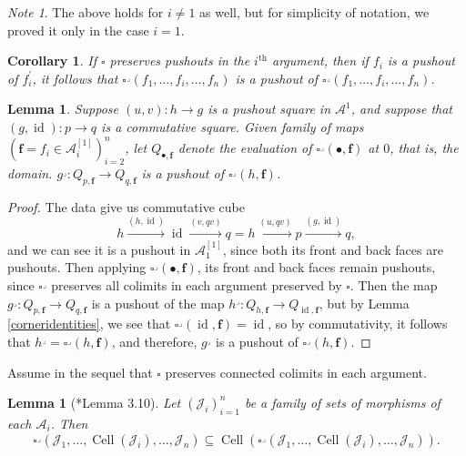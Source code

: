 \documentclass[leqno]{article}
\numberwithin{equation}{subsection}
\theoremstyle{plain}   %
\newtheorem{cor}[equation]{Corollary}
\newtheorem{lemma}[equation]{Lemma}
\theoremstyle{remark}
\newtheorem{note}[equation]{Note}
\theoremstyle{plain}
\DeclareMathOperator{\id}{id}
\begin{document}
\begin{note}
	The above holds for \(i\neq 1\) as well, but for simplicity of notation, we proved it only in the case \(i=1\).  
\end{note}
\begin{cor}\label{cornerpushouts}
	If \(\square\) preserves pushouts in the \(i^{\mathrm{th}}\) argument, then if \(f_i\) is a pushout of \(f_i^\prime\), it follows that \(\square^\lrcorner(f_1,\dots,f_i,\dots,f_n)\) is a pushout of \(\square^\lrcorner(f_1,\dots,f_i,\dots,f_n)\).
\end{cor}
\begin{lemma}
	Suppose \((u,v):h\to g\) is a pushout square in \(\mathcal{A}^1\), and suppose that \((g,\id):p\to q\) is a commutative square.  Given family of maps \((\mathbf{f}=f_i \in \mathcal{A}_i^{[1]})_{i=2}^n\), let \(Q_{\bullet,\mathbf{f}}\) denote the evaluation of \(\square^\lrcorner(\bullet,\mathbf{f})\) at \(0\), that is, the domain.  \(g^\lrcorner: Q_{p,\mathbf{f}} \to Q_{q,\mathbf{f}}\) is a pushout of \(\square^\lrcorner(h,\mathbf{f})\).  
\end{lemma}
\begin{proof} The data give us commutative cube 
	\[h \xrightarrow{(h,\id)} \id \xrightarrow{(v,qv)} q = h \xrightarrow{(u,qv)} p \xrightarrow{(g,\id)} q,\]
	and we can see it is a pushout in \(\mathcal{A}_1^{[1]}\), since both its front and back faces are pushouts.  Then applying \(\square^\lrcorner(\bullet,\mathbf{f})\), its front and back faces remain pushouts, since \(\square^\lrcorner\) preserves all colimits in each argument preserved by \(\square\).  Then the map \(g^\lrcorner: Q_{p,\mathbf{f}} \to Q_{q,\mathbf{f}}\)  is a pushout of the map \(h^\lrcorner:Q_{h,\mathbf{f}} \to Q_{\id,\mathbf{f}}\), but by Lemma \ref{corneridentities}, we see that \(\square^\lrcorner(\id,\mathbf{f})=\id\), so by commutativity, it follows that \(h^\lrcorner = \square^\lrcorner(h,\mathbf{f})\), and therefore, \(g^\lrcorner\) is a pushout of \(\square^\lrcorner(h,\mathbf{f})\).  
\end{proof}
Assume in the sequel that \(\square\) preserves connected colimits in each argument.
\begin{lemma}[\cite{oury}*{Lemma 3.10}]\label{cornertensorcell}
	Let \((\mathscr{J}_i)_{i=1}^n\) be a family of sets of morphisms of each \(\mathcal{A}_i\). Then 
	\[\square^\lrcorner(\mathscr{J}_1,\dots,\operatorname{Cell}(\mathscr{J}_i),\dots,\mathscr{J}_n) \subseteq \operatorname{Cell}(\square^\lrcorner(\mathscr{J}_1,\dots,\operatorname{Cell}(\mathscr{J}_i),\dots,\mathscr{J}_n)).\]
\end{lemma}
\end{document}
